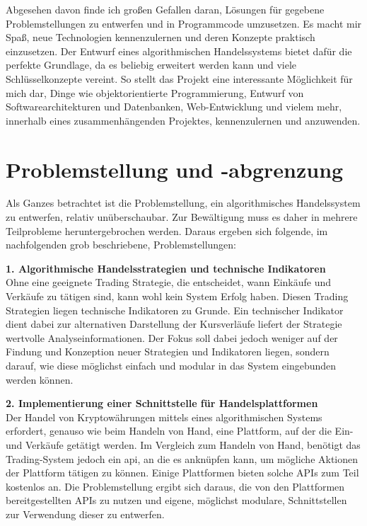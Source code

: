 \documentclass[oneside]{ausarbeitung}
\begin{document}
Abgesehen davon finde ich großen Gefallen daran, Lösungen für
gegebene Problemstellungen zu entwerfen und in Programmcode
umzusetzen. Es macht mir Spaß, neue Technologien kennenzulernen und
deren Konzepte praktisch einzusetzen. Der Entwurf eines
algorithmischen Handelssystems bietet dafür die perfekte Grundlage,
da es beliebig erweitert werden kann und viele Schlüsselkonzepte
vereint. So stellt das Projekt eine interessante Möglichkeit für
mich dar, Dinge wie objektorientierte Programmierung, Entwurf von
Softwarearchitekturen und Datenbanken, Web-Entwicklung und vielem
mehr, innerhalb eines zusammenhängenden Projektes, kennenzulernen und
anzuwenden.


\section{Problemstellung und -abgrenzung}
\label{sec:problemstellung}

Als Ganzes betrachtet ist die Problemstellung, ein algorithmisches
Handelssystem zu entwerfen, relativ unüberschaubar. Zur Bewältigung
muss es daher in mehrere Teilprobleme heruntergebrochen werden. Daraus
ergeben sich folgende, im nachfolgenden grob beschriebene,
Problemstellungen:

\textbf{1. Algorithmische Handelsstrategien und technische Indikatoren} \\
Ohne eine geeignete Trading Strategie, die entscheidet, wann Einkäufe
und Verkäufe zu tätigen sind, kann wohl kein System Erfolg haben.
Diesen Trading Strategien liegen technische Indikatoren zu Grunde. Ein
technischer Indikator dient dabei zur alternativen Darstellung der
Kursverläufe liefert der Strategie wertvolle Analyseinformationen.
Der Fokus soll dabei jedoch weniger auf der Findung und Konzeption
neuer Strategien und Indikatoren liegen, sondern darauf, wie diese
möglichst einfach und modular in das System eingebunden werden
können.

\textbf{2. Implementierung einer Schnittstelle für Handelsplattformen} \\
Der Handel von Kryptowährungen mittels eines algorithmischen Systems
erfordert, genauso wie beim Handeln von Hand, eine Plattform, auf der
die Ein- und Verkäufe getätigt werden. Im Vergleich zum Handeln von
Hand, benötigt das Trading-System jedoch ein \ac{api}, an die es
anknüpfen kann, um mögliche Aktionen der Plattform tätigen zu
können. Einige Plattformen bieten solche APIs zum Teil kostenlos an.
Die Problemstellung ergibt sich daraus, die von den Plattformen
bereitgestellten APIs zu nutzen und eigene, möglichst modulare,
Schnittstellen zur Verwendung dieser zu entwerfen.
\end{document}
